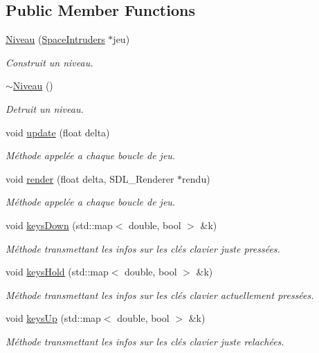 \subsection*{Public Member Functions}
\begin{DoxyCompactItemize}
\item 
\hyperlink{class_niveau_a0e9bc3e28ce24702949556c741a28bc5}{Niveau} (\hyperlink{class_space_intruders}{Space\+Intruders} $\ast$jeu)
\begin{DoxyCompactList}\small\item\em Construit un niveau. \end{DoxyCompactList}\item 
\hyperlink{class_niveau_ad5a39e5e034a061774564e145eb7cf61}{$\sim$\+Niveau} ()
\begin{DoxyCompactList}\small\item\em Detruit un niveau. \end{DoxyCompactList}\item 
void \hyperlink{class_niveau_a287b7fc08a2d7102008c134a72462d4f}{update} (float delta)
\begin{DoxyCompactList}\small\item\em Méthode appelée a chaque boucle de jeu. \end{DoxyCompactList}\item 
void \hyperlink{class_niveau_acde898f3c32db22484bd9ee8a94ac124}{render} (float delta, S\+D\+L\+\_\+\+Renderer $\ast$rendu)
\begin{DoxyCompactList}\small\item\em Méthode appelée a chaque boucle de jeu. \end{DoxyCompactList}\item 
void \hyperlink{class_niveau_a05eaf847a4d649a133d9259c0b9b2e2b}{keys\+Down} (std\+::map$<$ double, bool $>$ \&k)
\begin{DoxyCompactList}\small\item\em Méthode transmettant les infos sur les clés clavier juste pressées. \end{DoxyCompactList}\item 
void \hyperlink{class_niveau_a3730fe148bcfc20c96121769a48a0024}{keys\+Hold} (std\+::map$<$ double, bool $>$ \&k)
\begin{DoxyCompactList}\small\item\em Méthode transmettant les infos sur les clés clavier actuellement pressées. \end{DoxyCompactList}\item 
void \hyperlink{class_niveau_aceab76f09227e16b5dcdbb5ae0534ce9}{keys\+Up} (std\+::map$<$ double, bool $>$ \&k)
\begin{DoxyCompactList}\small\item\em Méthode transmettant les infos sur les clés clavier juste relachées. \end{DoxyCompactList}\end{DoxyCompactItemize}


